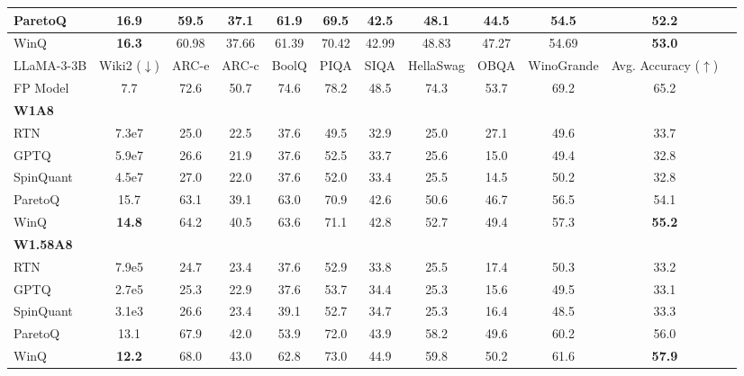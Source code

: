 \documentclass{article}
\theoremstyle{definition}
\newcommand{\acronym}{{\sc WinQ}}
\begin{document}
\begin{table}[t]
{\begin{tabular}{lc|cccccccccc}
    ParetoQ & 16.9 & 59.5 & 37.1 & 61.9 & 69.5 & 42.5 & 48.1 & 44.5 & 54.5 & 52.2 \\ \midrule
    \acronym{} & \textbf{16.3}  & 60.98 & 37.66 & 61.39 & 70.42 & 42.99 & 48.83 & 47.27 & 54.69 & \textbf{53.0} \\
    \midrule \midrule
    LLaMA-3-3B & {Wiki2} ($\downarrow$) & ARC-e &  ARC-c & BoolQ & PIQA & SIQA & HellaSwag & OBQA & WinoGrande & Avg. Accuracy ($\uparrow$)\\
     \midrule
    FP Model & 7.7 & 72.6 & 50.7 & 74.6 & 78.2 & 48.5 & 74.3 & 53.7 & 69.2 & 65.2 \\ \midrule
    \textbf{W1A8} \\ \midrule
    RTN & 7.3e7 & 25.0 & 22.5 & 37.6 & 49.5 & 32.9 & 25.0 & 27.1 & 49.6 & 33.7\\ 
    GPTQ & 5.9e7  & 26.6 & 21.9 & 37.6 & 52.5 & 33.7 & 25.6 & 15.0 & 49.4 & 32.8  \\
    SpinQuant & 4.5e7 & 27.0 & 22.0 & 37.6 & 52.0 & 33.4 & 25.5 & 14.5 & 50.2 & 32.8 \\
    ParetoQ & 15.7 & 63.1 & 39.1 & 63.0 & 70.9 & 42.6 & 50.6 & 46.7 & 56.5 & 54.1 \\ \midrule
    \acronym{} & \textbf{14.8} & 64.2 & 40.5 & 63.6 & 71.1 & 42.8 & 52.7 & 49.4 & 57.3 & \textbf{55.2} \\ \midrule \midrule
    \textbf{W1.58A8} \\ \midrule
    RTN & 7.9e5 & 24.7 & 23.4 & 37.6 & 52.9 & 33.8 & 25.5 & 17.4 & 50.3 & 33.2 \\ 
    GPTQ & 2.7e5 & 25.3 & 22.9 & 37.6 & 53.7 & 34.4 & 25.3 & 15.6 & 49.5 & 33.1  \\
    SpinQuant & 3.1e3 & 26.6 & 23.4 & 39.1 & 52.7 & 34.7 & 25.3 & 16.4 & 48.5 & 33.3 \\
    ParetoQ & 13.1 & 67.9 & 42.0 & 53.9 & 72.0 & 43.9 & 58.2 & 49.6 & 60.2 & 56.0 \\ \midrule
    \acronym{} & \textbf{12.2} & 68.0 & 43.0 & 62.8 & 73.0 & 44.9 & 59.8 & 50.2 & 61.6 & \textbf{57.9} \\
    \bottomrule
  \end{tabular}
  }
\end{table}
\end{document}
